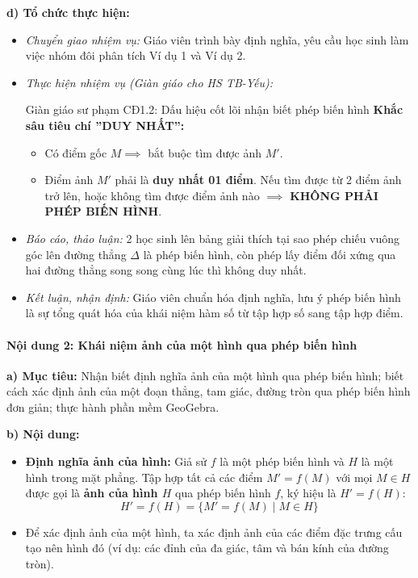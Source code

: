 \documentclass[12pt, a4paper]{article}
\begin{document}
\textbf{d) Tổ chức thực hiện:}
\begin{itemize}[leftmargin=0.6cm]
    \item \textit{Chuyển giao nhiệm vụ:} Giáo viên trình bày định nghĩa, yêu cầu học sinh làm việc nhóm đôi phân tích Ví dụ 1 và Ví dụ 2.
    \item \textit{Thực hiện nhiệm vụ (Giàn giáo cho HS TB-Yếu):}
    \begin{scaffoldbox}{Giàn giáo sư phạm CĐ1.2: Dấu hiệu cốt lõi nhận biết phép biến hình}
        \textbf{Khắc sâu tiêu chí ''DUY NHẤT'':}
        \begin{itemize}[leftmargin=0.5cm]
            \item Có điểm gốc $M \implies$ bắt buộc tìm được ảnh $M'$.
            \item Điểm ảnh $M'$ phải là \textbf{duy nhất 01 điểm}. Nếu tìm được từ 2 điểm ảnh trở lên, hoặc không tìm được điểm ảnh nào $\implies$ \textbf{KHÔNG PHẢI PHÉP BIẾN HÌNH}.
        \end{itemize}
    \end{scaffoldbox}
    \item \textit{Báo cáo, thảo luận:} 2 học sinh lên bảng giải thích tại sao phép chiếu vuông góc lên đường thẳng $\Delta$ là phép biến hình, còn phép lấy điểm đối xứng qua hai đường thẳng song song cùng lúc thì không duy nhất.
    \item \textit{Kết luận, nhận định:} Giáo viên chuẩn hóa định nghĩa, lưu ý phép biến hình là sự tổng quát hóa của khái niệm hàm số từ tập hợp số sang tập hợp điểm.
\end{itemize}

\paragraph{Nội dung 2: Khái niệm ảnh của một hình qua phép biến hình}
\textbf{a) Mục tiêu:} Nhận biết định nghĩa ảnh của một hình qua phép biến hình; biết cách xác định ảnh của một đoạn thẳng, tam giác, đường tròn qua phép biến hình đơn giản; thực hành phần mềm GeoGebra.

\textbf{b) Nội dung:}
\begin{itemize}[leftmargin=0.6cm]
    \item \textbf{Định nghĩa ảnh của hình:} Giả sử $f$ là một phép biến hình và $H$ là một hình trong mặt phẳng. Tập hợp tất cả các điểm $M' = f(M)$ với mọi $M \in H$ được gọi là \textbf{ảnh của hình $H$} qua phép biến hình $f$, ký hiệu là $H' = f(H)$:
    $$H' = f(H) = \{M' = f(M) \mid M \in H\}$$
    \item Để xác định ảnh của một hình, ta xác định ảnh của các điểm đặc trưng cấu tạo nên hình đó (ví dụ: các đỉnh của đa giác, tâm và bán kính của đường tròn).
\end{itemize}
\end{document}
